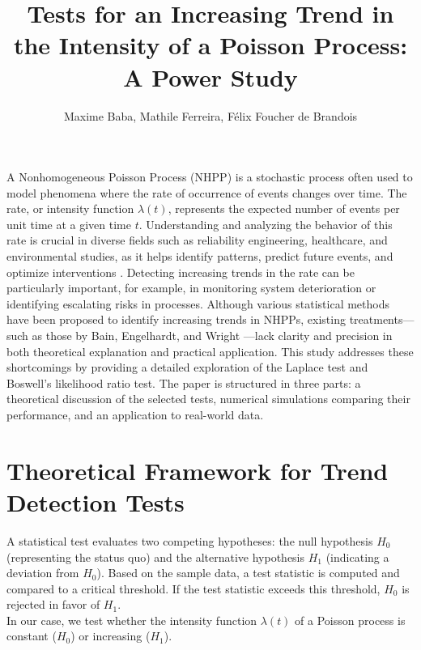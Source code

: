 \documentclass{journalstyle}
\title{Tests for an Increasing Trend in the Intensity of a Poisson Process: A Power Study}
\author{Maxime Baba, Mathile Ferreira, Félix Foucher de Brandois}
\begin{document}
\maketitle





A Nonhomogeneous Poisson Process (NHPP) is a stochastic process often used to model phenomena where the rate of occurrence of events changes over time.
The rate, or intensity function $\lambda(t)$, represents the expected number of events per unit time at a given time $t$.
Understanding and analyzing the behavior of this rate is crucial in diverse fields such as reliability engineering, healthcare, and environmental studies, as it helps identify patterns, predict future events, and optimize interventions \cite{ExampleIntervention}.
Detecting increasing trends in the rate can be particularly important, for example, in monitoring system deterioration or identifying escalating risks in processes.
Although various statistical methods have been proposed to identify increasing trends in NHPPs, existing treatments—such as those by Bain, Engelhardt, and Wright \cite{BainEngelhardtWright}—lack clarity and precision in both theoretical explanation and practical application.
This study addresses these shortcomings by providing a detailed exploration of the Laplace test and Boswell’s likelihood ratio test.
The paper is structured in three parts: a theoretical discussion of the selected tests, numerical simulations comparing their performance, and an application to real-world data.


\section{Theoretical Framework for Trend Detection Tests}

A statistical test evaluates two competing hypotheses: the null hypothesis $H_0$ (representing the status quo) and the alternative hypothesis $H_1$ (indicating a deviation from $H_0$).
Based on the sample data, a test statistic is computed and compared to a critical threshold.
If the test statistic exceeds this threshold, $H_0$ is rejected in favor of $H_1$. \\
In our case, we test whether the intensity function $\lambda(t)$ of a Poisson process is constant ($H_0$) or increasing ($H_1$).
\end{document}
